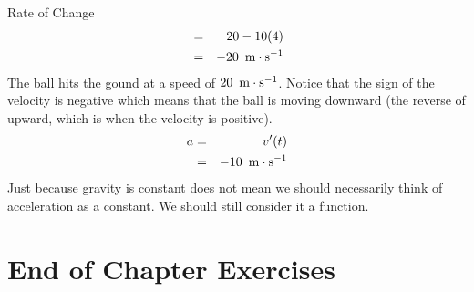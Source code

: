 \begin{wex}{Rate of Change}
{\begin{eqnarray*}
&=& 20 - 10(4)\\
&=& -20~\,\mathrm{m \cdot s^{-1}}\\
\end{eqnarray*}
The ball hits the gound at a speed of $20~\,\mathrm{m \cdot s^{-1}}$. Notice that the sign of the velocity is negative which means that the ball is moving downward (the reverse of upward, which is when the velocity is positive).
\begin{eqnarray*}
a &=& v'(t)\\
&=& -10 ~\,\mathrm{m \cdot s^{-1}}
\end{eqnarray*}
Just because gravity is constant does not mean we should necessarily think of acceleration as a constant. We should still consider it a function.
}
\end{wex}


\section{End of Chapter Exercises}

